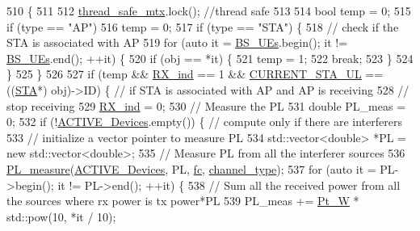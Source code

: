 \begin{DoxyCode}
510                                                  \{
511     
512     \hyperlink{AP_8cpp_aaa6351021119738f7a064778438f782c}{thread\_safe\_mtx}.lock(); \textcolor{comment}{//thread safe}
513     
514     \textcolor{keywordtype}{bool} temp = 0;
515     \textcolor{keywordflow}{if} (type == \textcolor{stringliteral}{"AP"})
516         temp = 0;
517     \textcolor{keywordflow}{if} (type == \textcolor{stringliteral}{"STA"}) \{
518         \textcolor{comment}{// check if the STA is associated with AP}
519         \textcolor{keywordflow}{for} (\textcolor{keyword}{auto} it = \hyperlink{classAP_ab4709e5956576b8131ae0c63af5c1151}{BS\_UEs}.begin(); it != \hyperlink{classAP_ab4709e5956576b8131ae0c63af5c1151}{BS\_UEs}.end(); ++it) \{
520             \textcolor{keywordflow}{if} (obj == *it) \{
521                 temp = 1;
522                 \textcolor{keywordflow}{break};
523             \}
524         \}
525     \}
526 
527     \textcolor{keywordflow}{if} (temp && \hyperlink{classAP_af5b1c2bc10a9ce9f3007bbf37f95f144}{RX\_ind} == 1 && \hyperlink{classAP_a78174ebdb27995f7dce372fc78f3e486}{CURRENT\_STA\_UL} == ((\hyperlink{classSTA}{STA}*) obj)->ID) \{ \textcolor{comment}{// if STA is
       associated with AP and AP is receiving}
528     \textcolor{comment}{// stop receiving}
529         \hyperlink{classAP_af5b1c2bc10a9ce9f3007bbf37f95f144}{RX\_ind} = 0;
530         \textcolor{comment}{// Measure the PL}
531         \textcolor{keywordtype}{double} PL\_meas = 0;
532         \textcolor{keywordflow}{if} (!\hyperlink{classAP_ab6dd8d2144b1be8dea239c3d76fc60cd}{ACTIVE\_Devices}.empty()) \{ \textcolor{comment}{// compute only if there are interferers}
533             \textcolor{comment}{// initialize a vector pointer to measure PL}
534             std::vector<double> *PL = \textcolor{keyword}{new} std::vector<double>;
535             \textcolor{comment}{// Measure PL from all the interferer sources}
536             \hyperlink{PL__measure_8cpp_afb433c5f099becf495d3c9d29ffc707d}{PL\_measure}(\hyperlink{classAP_ab6dd8d2144b1be8dea239c3d76fc60cd}{ACTIVE\_Devices}, PL, \hyperlink{classAP_af7f928faaa72cbfe5c4f905cb146a564}{fc}, 
      \hyperlink{classAP_a334f5b7be9725824797db57032de80e2}{channel\_type});
537             \textcolor{keywordflow}{for} (\textcolor{keyword}{auto} it = PL->begin(); it != PL->end(); ++it) \{
538                 \textcolor{comment}{// Sum all the received power from all the sources where rx power is tx power*PL}
539                 PL\_meas += \hyperlink{classAP_a10998008dbe6e924211af8d9ee155534}{Pt\_W} * std::pow(10, *it / 10);

\end{DoxyCode}
